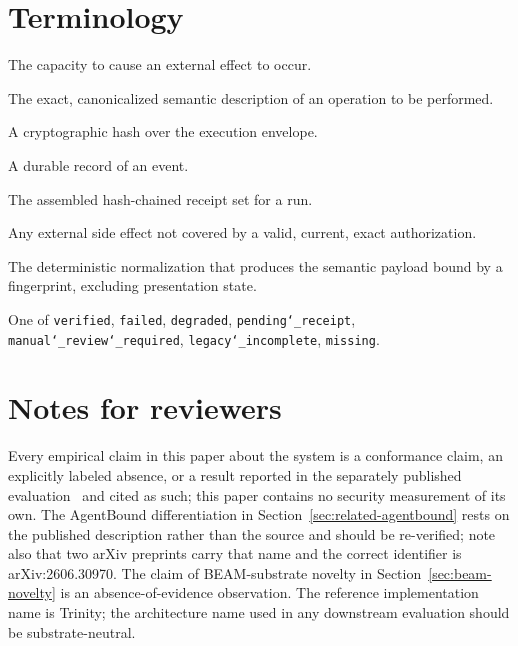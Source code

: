 \documentclass[11pt,letterpaper]{article}
\begin{document}
\appendix

\section{Terminology}\label{app:terminology}

\begin{description}[leftmargin=0em,style=unboxed,itemsep=0.15em,topsep=0.3em]
  \item[Authority] The capacity to cause an external effect to occur.
  \item[Execution envelope] The exact, canonicalized semantic description of an operation to be performed.
  \item[Fingerprint] A cryptographic hash over the execution envelope.
  \item[Receipt] A durable record of an event.
  \item[Proof packet] The assembled hash-chained receipt set for a run.
  \item[Unauthorized effect] Any external side effect not covered by a valid, current, exact authorization.
  \item[Canonicalization] The deterministic normalization that produces the semantic payload bound by a fingerprint, excluding presentation state.
  \item[Proof state] {\raggedright One of \texttt{verified}, \texttt{failed}, \texttt{degraded},
    \texttt{pending\char`_receipt}, \texttt{manual\char`_review\char`_required}, \texttt{legacy\char`_incomplete}, \texttt{missing}.\par}
\end{description}

\section{Notes for reviewers}\label{app:reviewers}

Every empirical claim in this paper about the system is a conformance claim, an explicitly labeled absence, or a result reported in the separately published evaluation~\cite{croft2026eval} and cited as such; this paper contains no security measurement of its own. The AgentBound differentiation in Section~\ref{sec:related-agentbound} rests on the published description rather than the source and should be re-verified; note also that two arXiv preprints carry that name and the correct identifier is arXiv:2606.30970. The claim of BEAM-substrate novelty in Section~\ref{sec:beam-novelty} is an absence-of-evidence observation. The reference implementation name is Trinity; the architecture name used in any downstream evaluation should be substrate-neutral.
\end{document}
